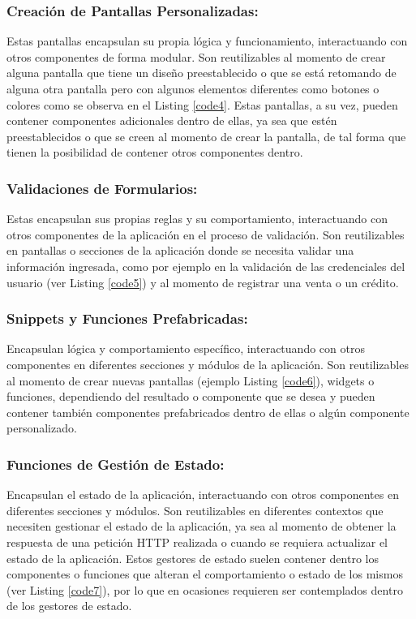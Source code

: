 \documentclass[runningheads]{llncs}
\begin{document}
\subsubsection*{Creación de Pantallas Personalizadas:}
Estas pantallas encapsulan su propia lógica y funcionamiento, interactuando con otros componentes de forma modular. Son reutilizables al momento de crear alguna pantalla que tiene un diseño preestablecido o que se está retomando de alguna otra pantalla pero con algunos elementos diferentes como botones o colores como se observa en el Listing \ref{code4}. Estas pantallas, a su vez, pueden contener componentes adicionales dentro de ellas, ya sea que estén preestablecidos o que se creen al momento de crear la pantalla, de tal forma que tienen la posibilidad de contener otros componentes dentro.


\subsubsection*{Validaciones de Formularios:}
Estas encapsulan sus propias reglas y su comportamiento, interactuando con otros componentes de la aplicación en el proceso de validación. Son reutilizables en pantallas o secciones de la aplicación donde se necesita validar una información ingresada, como por ejemplo en la validación de las credenciales del usuario (ver Listing \ref{code5}) y al momento de registrar una venta o un crédito.


\subsubsection*{Snippets y Funciones Prefabricadas:}
Encapsulan lógica y comportamiento específico, interactuando con otros componentes en diferentes secciones y módulos de la aplicación. Son reutilizables al momento de crear nuevas pantallas (ejemplo Listing \ref{code6}), widgets o funciones, dependiendo del resultado o componente que se desea y pueden contener también componentes prefabricados dentro de ellas o algún componente personalizado.


\subsubsection*{Funciones de Gestión de Estado:}
Encapsulan el estado de la aplicación, interactuando con otros componentes en diferentes secciones y módulos. Son reutilizables en diferentes contextos que necesiten gestionar el estado de la aplicación, ya sea al momento de obtener la respuesta de una petición HTTP realizada o cuando se requiera actualizar el estado de la aplicación. Estos gestores de estado suelen contener dentro los componentes o funciones que alteran el comportamiento o estado de los mismos (ver Listing \ref{code7}), por lo que en ocasiones requieren ser contemplados dentro de los gestores de estado.

\end{document}
